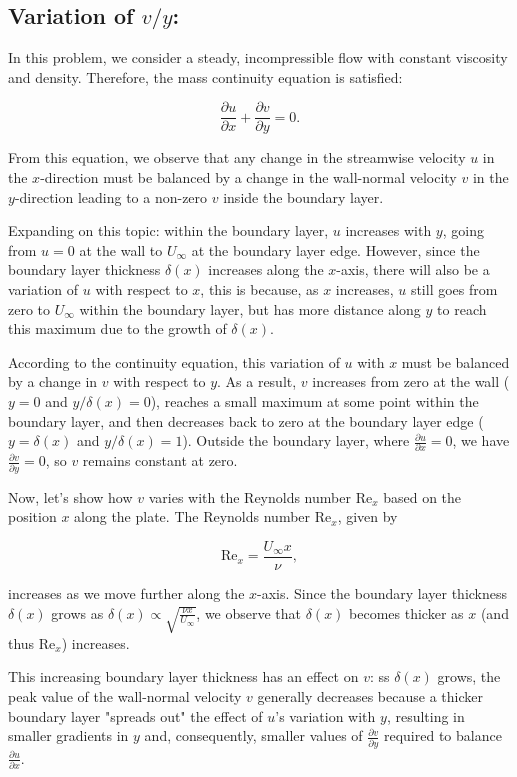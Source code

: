 \documentclass{article}
\begin{document}
\subsection{Variation of $v/y$:}
In this problem, we consider a steady, incompressible flow with constant viscosity and density. Therefore, the mass continuity equation is satisfied:

\[
\frac{\partial u}{\partial x} + \frac{\partial v}{\partial y} = 0.
\]

From this equation, we observe that any change in the streamwise velocity \( u \) in the \( x \)-direction must be balanced by a change in the wall-normal velocity \( v \) in the \( y \)-direction leading to a non-zero \( v \) inside the boundary layer.

Expanding on this topic: within the boundary layer, \( u \) increases with \( y \), going from \( u = 0 \) at the wall to \( U_\infty \) at the boundary layer edge. However, since the boundary layer thickness \( \delta(x) \) increases along the \( x \)-axis, there will also be a variation of \( u \) with respect to \( x \), this is because, as \( x \) increases, \( u \) still goes from zero to \( U_\infty \) within the boundary layer, but has more distance along \( y \) to reach this maximum due to the growth of \( \delta(x) \).

According to the continuity equation, this variation of \( u \) with \( x \) must be balanced by a change in \( v \) with respect to \( y \). As a result, \( v \) increases from zero at the wall (\(y = 0\) and \( y / \delta(x) = 0\)), reaches a small maximum at some point within the boundary layer, and then decreases back to zero at the boundary layer edge (\(y = \delta(x)\) and \( y / \delta(x) = 1\)). Outside the boundary layer, where \( \frac{\partial u}{\partial x} = 0 \), we have \( \frac{\partial v}{\partial y} = 0 \), so \( v \) remains constant at zero.

Now, let’s show how \( v \) varies with the Reynolds number \( \text{Re}_x \) based on the position \( x \) along the plate. The Reynolds number \( \text{Re}_x \), given by

\[
\text{Re}_x = \frac{U_\infty x}{\nu},
\]

increases as we move further along the \(x\)-axis. Since the boundary layer thickness \( \delta(x) \) grows as \( \delta(x) \propto \sqrt{\frac{\nu x}{U_\infty}} \), we observe that \( \delta(x) \) becomes thicker as \( x \) (and thus \( \text{Re}_x \)) increases.

This increasing boundary layer thickness has an effect on \( v \): ss \( \delta(x) \) grows, the peak value of the wall-normal velocity \( v \) generally decreases because a thicker boundary layer "spreads out" the effect of \( u \)’s variation with \( y \), resulting in smaller gradients in \( y \) and, consequently, smaller values of \( \frac{\partial v}{\partial y} \) required to balance \( \frac{\partial u}{\partial x} \).
\end{document}
